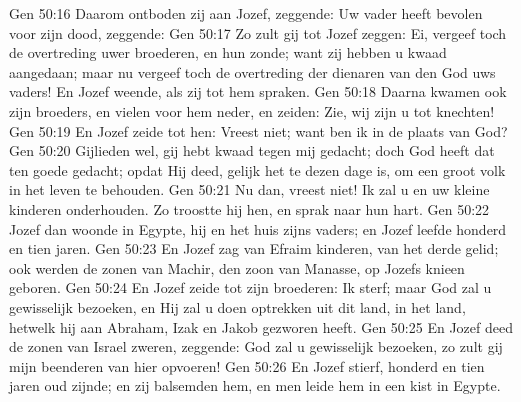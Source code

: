 Gen 50:16  Daarom ontboden zij aan Jozef, zeggende: Uw vader heeft bevolen voor zijn dood, zeggende:
Gen 50:17  Zo zult gij tot Jozef zeggen: Ei, vergeef toch de overtreding uwer broederen, en hun zonde; want zij hebben u kwaad aangedaan; maar nu vergeef toch de overtreding der dienaren van den God uws vaders! En Jozef weende, als zij tot hem spraken.
Gen 50:18  Daarna kwamen ook zijn broeders, en vielen voor hem neder, en zeiden: Zie, wij zijn u tot knechten!
Gen 50:19  En Jozef zeide tot hen: Vreest niet; want ben ik in de plaats van God?
Gen 50:20  Gijlieden wel, gij hebt kwaad tegen mij gedacht; doch God heeft dat ten goede gedacht; opdat Hij deed, gelijk het te dezen dage is, om een groot volk in het leven te behouden.
Gen 50:21  Nu dan, vreest niet! Ik zal u en uw kleine kinderen onderhouden. Zo troostte hij hen, en sprak naar hun hart.
Gen 50:22  Jozef dan woonde in Egypte, hij en het huis zijns vaders; en Jozef leefde honderd en tien jaren.
Gen 50:23  En Jozef zag van Efraim kinderen, van het derde gelid; ook werden de zonen van Machir, den zoon van Manasse, op Jozefs knieen geboren.
Gen 50:24  En Jozef zeide tot zijn broederen: Ik sterf; maar God zal u gewisselijk bezoeken, en Hij zal u doen optrekken uit dit land, in het land, hetwelk hij aan Abraham, Izak en Jakob gezworen heeft.
Gen 50:25  En Jozef deed de zonen van Israel zweren, zeggende: God zal u gewisselijk bezoeken, zo zult gij mijn beenderen van hier opvoeren!
Gen 50:26  En Jozef stierf, honderd en tien jaren oud zijnde; en zij balsemden hem, en men leide hem in een kist in Egypte.




